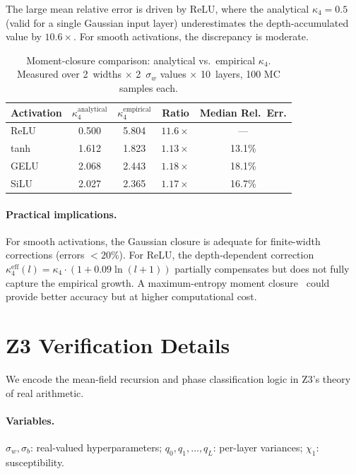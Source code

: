 \documentclass[10pt]{article}
\begin{document}
The large mean relative error is driven by ReLU, where the analytical $\kappa_4 = 0.5$ (valid for a single Gaussian input layer) underestimates the depth-accumulated value by $10.6\times$.
For smooth activations, the discrepancy is moderate.

\begin{table}[h]
\centering
\caption{Moment-closure comparison: analytical vs.\ empirical $\kappa_4$. Measured over 2~widths $\times$ 2~$\sigma_w$ values $\times$ 10~layers, 100 MC samples each.}
\label{tab:kappa4}
\small
\begin{tabular}{@{}lcccc@{}}
\toprule
\textbf{Activation} & $\kappa_4^{\text{analytical}}$ & $\kappa_4^{\text{empirical}}$ & \textbf{Ratio} & \textbf{Median Rel.\ Err.} \\
\midrule
ReLU  & 0.500 & 5.804 & $11.6\times$ & --- \\
tanh  & 1.612 & 1.823 & $1.13\times$ & 13.1\% \\
GELU  & 2.068 & 2.443 & $1.18\times$ & 18.1\% \\
SiLU  & 2.027 & 2.365 & $1.17\times$ & 16.7\% \\
\bottomrule
\end{tabular}
\end{table}

\paragraph{Practical implications.}
For smooth activations, the Gaussian closure is adequate for finite-width corrections (errors $< 20\%$).
For ReLU, the depth-dependent correction $\kappa_4^{\text{eff}}(l) = \kappa_4 \cdot (1 + 0.09\ln(l+1))$ partially compensates but does not fully capture the empirical growth.
A maximum-entropy moment closure~\cite{bordelon2020spectrum} could provide better accuracy but at higher computational cost.

\section{Z3 Verification Details}
\label{app:z3}

We encode the mean-field recursion and phase classification logic in Z3's theory of real arithmetic.

\paragraph{Variables.}
$\sigma_w, \sigma_b$: real-valued hyperparameters; $q_0, q_1, \ldots, q_L$: per-layer variances; $\chi_1$: susceptibility.
\end{document}
